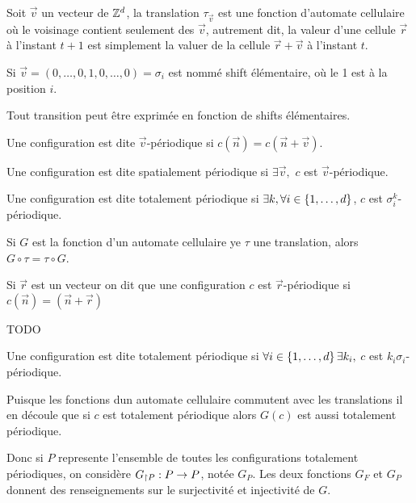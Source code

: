 \begin{definition}
	Soit $\vec v$ un vecteur de $\mathbb{Z}^d$, la translation $\tau_{\vec v}$ est une fonction d'automate cellulaire où le voisinage contient seulement des $\vec v$,
	autrement dit, la valeur d'une cellule $\vec r$ à l'instant $t+1$ est simplement la valuer de la cellule $\vec r + \vec v$ à l'instant $t$.


	Si $\vec v = (0,\ldots,0, 1, 0, \ldots, 0) = \sigma_i$ est nommé shift élémentaire, où le 1 est à la position $i$.

	Tout transition peut être exprimée en fonction de shifts élémentaires.
\end{definition}

\begin{definition}
	Une configuration est dite $\vec v$-périodique si $c(\vec n) = c (\vec n + \vec v)$.
\end{definition}

\begin{definition}
	Une configuration est dite spatialement périodique si $\exists \vec v,$ \tq $c$ est $\vec v$-périodique.
\end{definition}


\begin{definition}
	Une configuration est dite totalement périodique si $\exists k, \forall i \in \left\{1,\ldots,d\right\}$, $c$ est $\sigma_i^k$-périodique.
\end{definition}

\begin{prop}
	Si $G$ est la fonction d'un automate cellulaire ye $\tau$ une translation, alors $G \circ \tau = \tau \circ G$.
\end{prop}

\begin{definition}
	Si $\vec r$ est un vecteur on dit que une configuration $c$ est $\vec r$-périodique si $c(\vec n) = (\vec n + \vec r)$
\end{definition}

\begin{exemple}
	TODO
\end{exemple}

\begin{definition}
	Une configuration est dite totalement périodique si $\forall i \in \left\{1,\ldots,d\right\}\exists k_i, $ \tq $c$ est $k_i\sigma_i$-périodique.
\end{definition}

\begin{remarque}
	Puisque les fonctions dun automate cellulaire commutent avec les translations il en découle que si $c$ est totalement périodique alors $G(c)$
	est aussi totalement périodique.

	Donc si $P$ represente l'ensemble de toutes les configurations totalement périodiques, on considère $G_{\restriction P} : P \to P$, notée $G_P$.
	Les deux fonctions $G_F$ et $G_P$ donnent des renseignements sur le surjectivité et injectivité de $G$.
\end{remarque}

